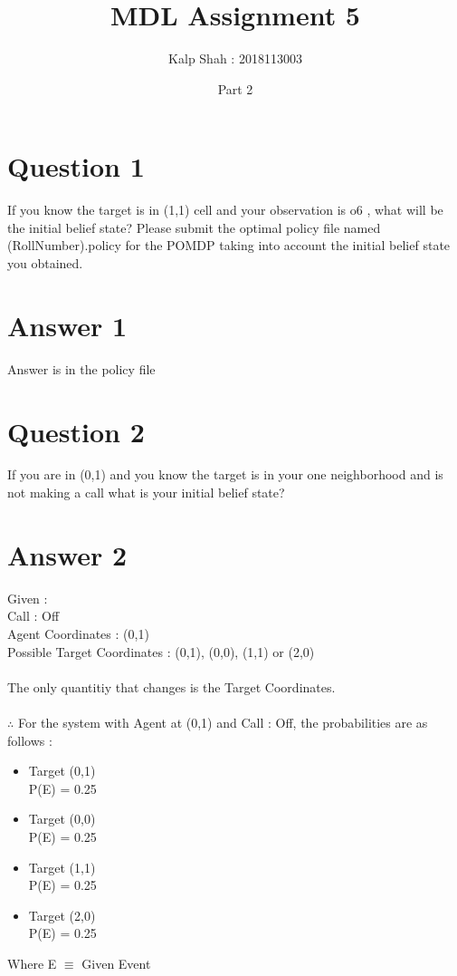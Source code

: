 \documentclass[10pt,letterpaper]{article}
\title{MDL Assignment 5}
\date{Part 2}
\author{Kalp Shah : 2018113003}
\begin{document}
\maketitle

\section*{Question 1}
If you know the target is in (1,1) cell and your observation is o6 , what will be
the initial belief state? Please submit the optimal policy file named
(RollNumber).policy for the POMDP taking into account the initial belief
state you obtained.
\section*{Answer 1}
Answer is in the policy file

\section*{Question 2}
If you are in (0,1) and you know the target is in your one neighborhood and
is not making a call what is your initial belief state?
\section*{Answer 2}
Given : \\
\hspace*{23pt} Call : Off\\
\hspace*{23pt} Agent Coordinates : (0,1)\\
\hspace*{23pt} Possible Target Coordinates : (0,1), (0,0), (1,1) or (2,0)\\\\
The only quantitiy that changes is the Target Coordinates.\\\\
$\therefore$ For the system with Agent at (0,1) and Call : Off, the 
probabilities are as follows :
\begin{itemize}
    \item Target (0,1)\\ \hspace*{23pt} P(E) = 0.25
    \item Target (0,0)\\ \hspace*{23pt} P(E) = 0.25
    \item Target (1,1)\\ \hspace*{23pt} P(E) = 0.25
    \item Target (2,0)\\ \hspace*{23pt} P(E) = 0.25
\end{itemize}
Where E $\equiv$ Given Event
\end{document}
